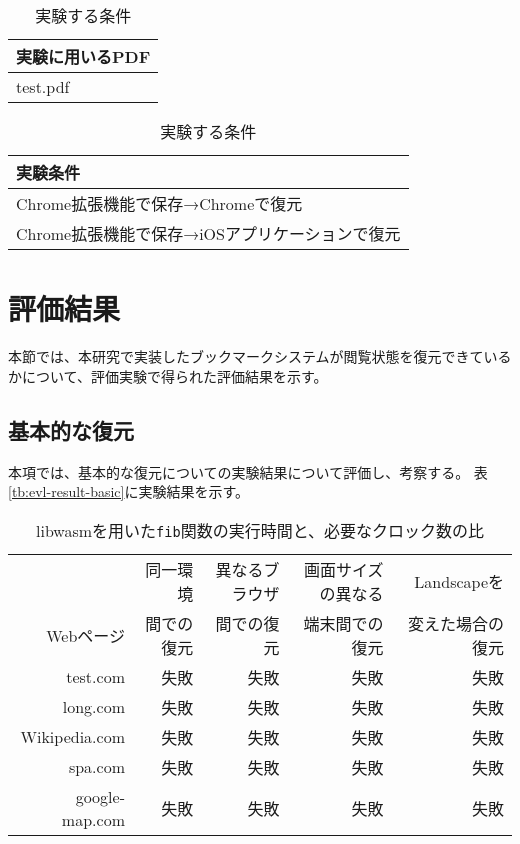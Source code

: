 \begin{table}[htbp]
  \label{tb:evl-pdf-list}
  \caption{実験する条件}
  \begin{center}
    \begin{tabular}{|l|}
    \hline
    実験に用いるPDF  \\ \hline
    test.pdf \\ \hline
    \end{tabular}
  \end{center}
\end{table}

\begin{table}[htbp]
  \label{tb:evl-pdf-conditions}
  \caption{実験する条件}
  \begin{center}
    \begin{tabular}{|l|}
    \hline
    実験条件  \\ \hline
    Chrome拡張機能で保存→Chromeで復元 \\ \hline
    Chrome拡張機能で保存→iOSアプリケーションで復元 \\ \hline
    \end{tabular}
  \end{center}
\end{table}

\section{評価結果}
本節では、本研究で実装したブックマークシステムが閲覧状態を復元できているかについて、評価実験で得られた評価結果を示す。

\subsection{基本的な復元}
本項では、基本的な復元についての実験結果について評価し、考察する。
表\ref{tb:evl-result-basic}に実験結果を示す。

\begin{table}[htbp]
  \caption{libwasmを用いた{\tt fib}関数の実行時間と、必要なクロック数の比}
  \label{tab:evl-result-basic}
  \begin{center}
    \begin{tabular}{rrrrr}
      \hline
      & 同一環境 & 異なるブラウザ & 画面サイズの異なる &  Landscapeを \\
       Webページ & 間での復元 & 間での復元 & 端末間での復元 & 変えた場合の復元 \\ \hline \hline
      test.com & 失敗 & 失敗 &  失敗 & 失敗 \\ \hline
      long.com & 失敗 & 失敗 &  失敗 & 失敗 \\ \hline
      Wikipedia.com & 失敗 & 失敗 &  失敗 & 失敗 \\ \hline
      spa.com & 失敗 & 失敗 &  失敗 & 失敗 \\ \hline
      google-map.com & 失敗 & 失敗 &  失敗 & 失敗 \\ \hline
    \end{tabular}
  \end{center}
\end{table}


